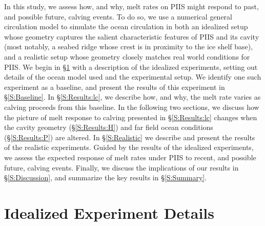 \documentclass[draft]{agujournal2019}
\begin{document}
In this study, we assess how, and why, melt rates on PIIS might respond to past, and possible future, calving events. To do so, we use a numerical general circulation model to simulate the ocean circulation in both an idealized setup whose geometry captures the salient characteristic features of PIIS and its cavity (most notably, a seabed ridge whose crest is in proximity to the ice shelf base), and a realistic setup whose geometry closely matches real world conditions for PIIS. We begin in \S\ref{S:Experiment} with a description of the idealized experiments, setting out details of the ocean model used and the experimental setup. We identify one such experiment as a baseline, and present the results of this experiment in \S\ref{S:Baseline}. In \S\ref{S:Results:lc}, we describe how, and why, the melt rate varies as calving proceeds from this baseline. In the following two sections, we discuss how the picture of melt response to calving presented in \S\ref{S:Results:lc} changes when the cavity geometry (\S\ref{S:Results:H}) and far field ocean conditions (\S\ref{S:Results:P}) are altered. In \S\ref{S:Realistic} we describe and present the results of  the realistic experiments. Guided by the results of the idealized experiments, we assess the expected response of melt rates under PIIS to recent, and possible future, calving events. Finally, we discuss the implications of our results in \S\ref{S:Discussion}, and summarize the key results in \S\ref{S:Summary}.


\section{Idealized Experiment Details}\label{S:Experiment}
\end{document}
